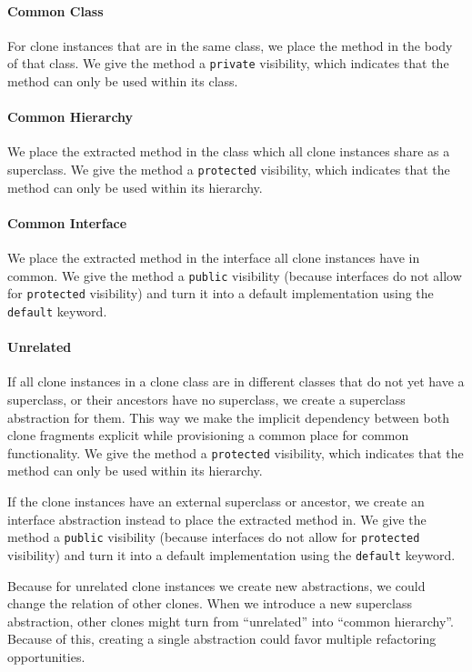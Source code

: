 \paragraph{Common Class}
For clone instances that are in the same class, we place the method in the body of that class. We give the method a \texttt{private} visibility, which indicates that the method can only be used within its class.

\paragraph{Common Hierarchy}
We place the extracted method in the class which all clone instances share as a superclass. We give the method a \texttt{protected} visibility, which indicates that the method can only be used within its hierarchy.

\paragraph{Common Interface}
We place the extracted method in the interface all clone instances have in common.  We give the method a \texttt{public} visibility (because interfaces do not allow for \texttt{protected} visibility) and turn it into a default implementation using the \texttt{default} keyword.

\paragraph{Unrelated}
If all clone instances in a clone class are in different classes that do not yet have a superclass, or their ancestors have no superclass, we create a superclass abstraction for them. This way we make the implicit dependency between both clone fragments explicit while provisioning a common place for common functionality. We give the method a \texttt{protected} visibility, which indicates that the method can only be used within its hierarchy.

If the clone instances have an external superclass or ancestor, we create an interface abstraction instead to place the extracted method in. We give the method a \texttt{public} visibility (because interfaces do not allow for \texttt{protected} visibility) and turn it into a default implementation using the \texttt{default} keyword.

Because for unrelated clone instances we create new abstractions, we could change the relation of other clones. When we introduce a new superclass abstraction, other clones might turn from ``unrelated'' into ``common hierarchy''. Because of this, creating a single abstraction could favor multiple refactoring opportunities.

